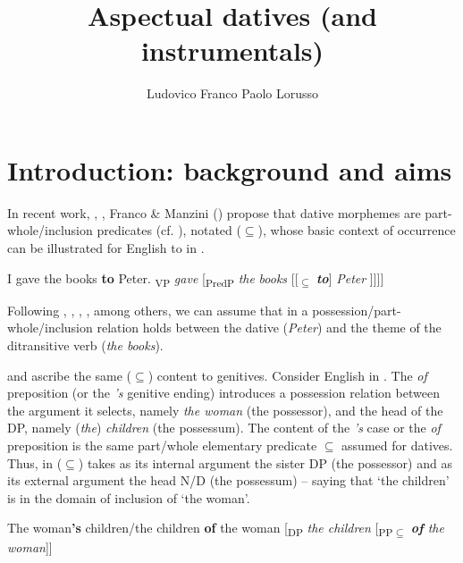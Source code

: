 \documentclass[output=paper,modfonts,nonflat,newtxmath,colorlinks,citecolor=brown]{langsci/langscibook}
\author{Ludovico Franco\affiliation{Università di Firenze}\lastand
Paolo Lorusso\affiliation{Istituto Universitario Studi Superiori (IUSS) Pavia }}
\title{Aspectual datives (and instrumentals)}
\begin{document}
\maketitle



\section{Introduction: background and aims}
\label{sec:franco:1}

In recent work, \citet{ManziniSavoia2011}, \citet{ManziniFranco2016}, Franco \& Manzini (\citeyear{FrancoManzini2017Gen, FrancoManzini2017Ins}) propose that dative morphemes are part-whole/inclusion predicates (cf.  \citealt{BelvinDenDikken1997}), notated (${\subseteq}$), whose basic context of occurrence can be illustrated for English {to} in .

\ea%
    \label{ex:franco:1}
    \ea I gave the books \textbf{to} Peter.
   \ex  {[}\textsubscript{VP} \textit{gave} [\textsubscript{PredP} \textit{the} \textit{books} [[\textsubscript{${\subseteq}$} \textbf{\textit{to}}] \textit{Peter} ]{]]]}
   \z
    \z

Following \citet{Kayne1984}, \citet{Pesetsky1995}, \citet{BeckJohnson2004}, \citet{Harley2002}, among others, we can assume that in  a possession/part-whole/inclusion relation holds between the dative (\textit{Peter}) and the theme of the ditransitive verb (\textit{the books}).

\citet{ManziniSavoia2011, ManziniFranco2016} and \citet{FrancoManzini2017Gen} ascribe the same (${\subseteq}$) content to genitives. Consider English in . The \textit{of} preposition (or the \textit{’s} genitive ending) introduces a possession relation between the argument it selects, namely \textit{the woman} (the possessor), and the head of the DP, namely (\textit{the}) \textit{children} (the possessum). The content of the \textit{’s} case or the \textit{of} preposition is the same part/whole elementary predicate ${\subseteq}$ assumed for datives. Thus, in  (${\subseteq}$) takes as its internal argument the sister DP (the possessor) and as its external argument the head N/D (the possessum) – saying that ‘the children’ is in the domain of inclusion of ‘the woman’.

\ea%
    \label{ex:franco:2}
    \ea \label{ex:franco:2a}The woman\textbf{’s} children/the children \textbf{of} the woman
    \ex \label{ex:franco:2b}{[}\textsubscript{DP} \textit{the children} [\textsubscript{PP${\subseteq}$} \textit{\textbf{of} the woman}{]]}
    \z
    \z
\end{document}
